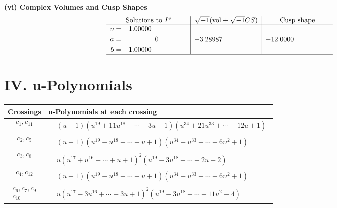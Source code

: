 \documentclass[1p]{elsarticle_modified}
\theoremstyle{definition}
\newcommand{\I}{\sqrt{-1}}
\begin{document}
\newpage\flushleft \textbf{(vi) Complex Volumes and Cusp Shapes}
$$\begin{array}{c|c|c}  
\text{Solutions to }I^v_{1}& \I (\text{vol} + \sqrt{-1}CS) & \text{Cusp shape}\\
 \hline 
\begin{aligned}
v &= -1.00000\phantom{ +0.000000I} \\
a &= \phantom{-0.000000 } 0 \\
b &= \phantom{-}1.00000\phantom{ +0.000000I}\end{aligned}
 & -3.28987\phantom{ +0.000000I} & -12.0000\phantom{ +0.000000I}\\
 \hline 
 \end{array}$$\newpage
\newpage\renewcommand{\arraystretch}{1}
\centering \section*{ IV. u-Polynomials}
\begin{tabular}{m{50pt}|m{274pt}}
Crossings & \hspace{64pt}u-Polynomials at each crossing \\
\hline $$\begin{aligned}c_{1},c_{11}\end{aligned}$$&$\begin{aligned}
&(u-1)(u^{19}+11 u^{18}+\cdots+3 u+1)(u^{34}+21 u^{33}+\cdots+12 u+1)
\end{aligned}$\\
\hline $$\begin{aligned}c_{2},c_{5}\end{aligned}$$&$\begin{aligned}
&(u-1)(u^{19}- u^{18}+\cdots- u+1)(u^{34}- u^{33}+\cdots-6 u^2+1)
\end{aligned}$\\
\hline $$\begin{aligned}c_{3},c_{8}\end{aligned}$$&$\begin{aligned}
&u(u^{17}+u^{16}+\cdots+u+1)^{2}(u^{19}-3 u^{18}+\cdots-2 u+2)
\end{aligned}$\\
\hline $$\begin{aligned}c_{4},c_{12}\end{aligned}$$&$\begin{aligned}
&(u+1)(u^{19}- u^{18}+\cdots- u+1)(u^{34}- u^{33}+\cdots-6 u^2+1)
\end{aligned}$\\
\hline $$\begin{aligned}c_{6},c_{7},c_{9}\\c_{10}\end{aligned}$$&$\begin{aligned}
&u(u^{17}-3 u^{16}+\cdots-3 u+1)^{2}(u^{19}-3 u^{18}+\cdots-11 u^2+4)
\end{aligned}$\\
\hline
\end{tabular}\newpage\renewcommand{\arraystretch}{1}
\end{document}
